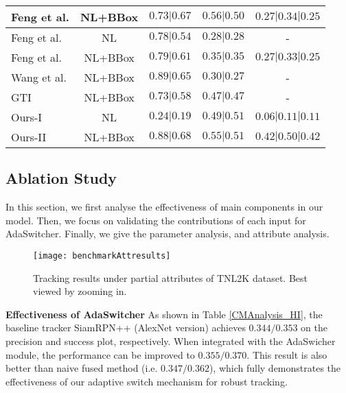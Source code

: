 \documentclass[final]{cvpr}
\begin{document}
\begin{table}
\begin{tabular}{l|c|c|c|c}
Feng et al. \cite{feng2019robust} 			&NL+BBox        	&$0.73|0.67$       		&$0.56|0.50$     		&$0.27|0.34|0.25$        			 \\
\hline 
Feng et al. \cite{feng2020langTrackwacv}		&NL        				&$0.78|0.54$       		&$0.28|0.28$     		&-        			 \\
Feng et al. \cite{feng2020langTrackwacv}		&NL+BBox        	&$0.79|0.61$       		&$0.35|0.35$     		&$0.27|0.33|0.25$        			 \\
\hline 
Wang et al. \cite{wang2018describe}		&NL+BBox        	&$0.89|0.65$       		&$0.30|0.27$     		&-        			 \\ 
\hline 
GTI \cite{yang2019grounding} 				&NL+BBox       	&$0.73|0.58$       		&$0.47|0.47$     		&-        			 \\
\hline \toprule [0.8 pt]
Ours-I														&NL        				&$0.24|0.19$       	&$0.49|0.51$     			&$0.06|0.11|0.11$       \\				Ours-II														&NL+BBox        	&$0.88|0.68$       &$0.55|0.51$			    &$0.42|0.50|0.42$       \\				\hline \toprule [0.8 pt]
\end{tabular}
\end{table}	

  











\subsection{Ablation Study} 

In this section, we first analyse the effectiveness of main components in our model. Then, we focus on validating the contributions of each input for AdaSwitcher. Finally, we give the parameter analysis, and attribute analysis. 


\begin{figure*}[!htb]
\center
\texttt{[image: benchmarkAttresults]}
\caption{	Tracking results under partial attributes of TNL2K dataset. Best viewed by zooming in.  }
\label{benchmarkAttresults}
\end{figure*} 	



\textbf{Effectiveness of AdaSwitcher } 
As shown in Table \ref{CMAnalysis_HI}, the baseline tracker SiamRPN++ \cite{li2018siamrpn++} (AlexNet version) achieves $0.344/0.353$ on the precision and success plot, respectively. When integrated with the AdaSwicher module, the performance can be improved to $0.355/0.370$. This result is also better than naive fused method (i.e. $0.347/0.362$), which fully demonstrates the effectiveness of our adaptive switch mechanism for robust tracking. 
\end{document}
